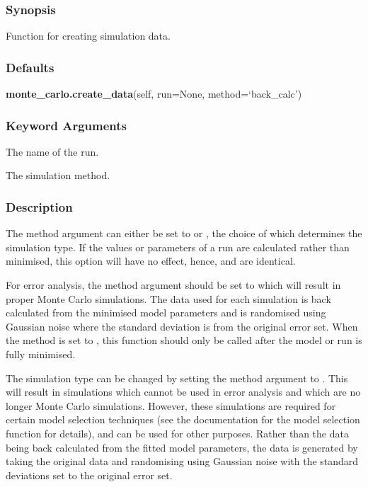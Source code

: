 \subsubsection{Synopsis}

Function for creating simulation data.

\subsubsection{Defaults}

\textsf{\textbf{monte\_carlo.create\_data}(self, run=None, method=`back\_calc')}


\subsubsection{Keyword Arguments}


  The name of the run.

  The simulation method.

\subsubsection{Description}

The method argument can either be set to 
 or 
, the choice of which
determines the simulation type.  If the values or parameters of a run are calculated rather
than minimised, this option will have no effect, hence, 
 and 
 are
identical.

For error analysis, the method argument should be set to 
 which will result in
proper Monte Carlo simulations.  The data used for each simulation is back calculated from
the minimised model parameters and is randomised using Gaussian noise where the standard
deviation is from the original error set.  When the method is set to 
, this
function should only be called after the model or run is fully minimised.

The simulation type can be changed by setting the method argument to 
.  This will
result in simulations which cannot be used in error analysis and which are no longer Monte
Carlo simulations.  However, these simulations are required for certain model selection
techniques (see the documentation for the model selection function for details), and can be
used for other purposes.  Rather than the data being back calculated from the fitted model
parameters, the data is generated by taking the original data and randomising using Gaussian
noise with the standard deviations set to the original error set.



